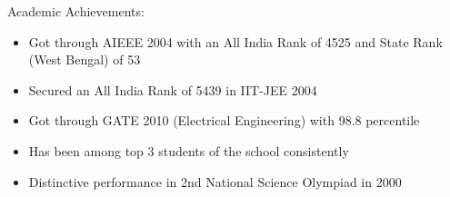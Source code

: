 \documentclass[10pt]{article}
\begin{document}
\begin{cv}
\begin{cvlist}{Academic Achievements:}
\item
\begin{itemize}\itemsep=0.25em
	\item
Got through AIEEE 2004 with an All India Rank of 4525 and State Rank (West Bengal) of 53

\item

 Secured an All India Rank of 5439 in IIT-JEE 2004

\item
Got through GATE 2010 (Electrical Engineering) with 98.8 percentile

\item
Has been among top 3 students of the school consistently

\item
Distinctive performance in 2nd National Science Olympiad in 2000


	\end{itemize}

\end{cvlist}



\end{cv}
\end{document}
